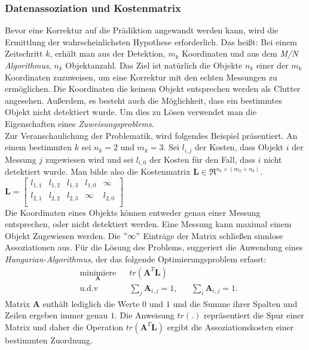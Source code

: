 \documentclass[10pt,a4paper]{article}
\begin{document}
\subsubsection{Datenassoziation und Kostenmatrix}
Bevor eine Korrektur auf die Prädiktion angewandt werden kann, wird die Ermittlung der wahrscheinlichsten Hypothese erforderlich. Das heißt: Bei einem Zeitschritt $k$, erhält man aus der Detektion, $m_k$ Koordinaten und aus dem \textit{M/N Algorithmus}, $n_k$ Objektanzahl. Das Ziel ist natürlich die Objekte $n_k$ einer der $m_k$ Koordinaten zuzuweisen, um eine Korrektur mit den echten Messungen zu ermöglichen. Die Koordinaten die keinem Objekt entsprechen werden als Clutter angesehen. Außerdem, es besteht auch die Möglichkeit, dass ein bestimmtes Objekt nicht detektiert wurde. Um dies zu Lösen verwendet man die Eigenschaften eines \textit{Zuweisungsproblems}.\\
Zur Veranschaulichung der Problematik, wird folgendes Beispiel präsentiert. An einem bestimmten $k$ sei $n_k = 2$ und $m_k = 3$. Sei $l_{i,j}$ der Kosten, dass Objekt $i$ der Messung $j$ zugewiesen wird und sei $l_{i,0}$ der Kosten für den Fall, dass $i$ nicht detektiert wurde. Man bilde also die Kostenmatrix $\textbf{L} \in \Re^{n_k\times (m_k +n_k) }$.\\
\newline
$\textbf{L} = \begin{bmatrix}
l_{1,1} & l_{1,2} & l_{1,3} & l_{1,0}& \infty \\
l_{2,1} & l_{2,2} & l_{2,3} &\infty & l_{2,0} \\
\end{bmatrix}$\\
\newline
Die Koordinaten eines Objekts können entweder genau einer Messung entsprechen, oder nicht detektiert werden. Eine Messung kann maximal einem Objekt Zugewiesen werden. Die $"\infty"$
Einträge der Matrix schließen sinnlose Assoziationen aus. Für die Lösung des Problems, suggeriert \cite{hungarian} die Anwendung eines \textit{Hungarian-Algorithmus}, der das folgende Optimierungsproblem erfasst:
\begin{equation}
\begin{aligned}
& \underset{\textbf{A}}{\text{minimiere}}
& & tr(\textbf{A}^T\textbf{L}) \\
& \text{u.d.v}
& & \sum_j \textbf{A}_{i,j} = 1,
& & \sum_i \textbf{A}_{i,j} = 1.
\end{aligned}
\end{equation}
Matrix \textbf{A} enthält lediglich die Werte $0$ und $1$ und die Summe ihrer Spalten und Zeilen ergeben immer genau $1$. Die Anweisung $tr(.)$ repräsentiert die Spur einer Matrix und daher die Operation $tr(\textbf{A}^T\textbf{L})$ ergibt die Assoziationskosten einer bestimmten Zuordnung. \\
\end{document}
